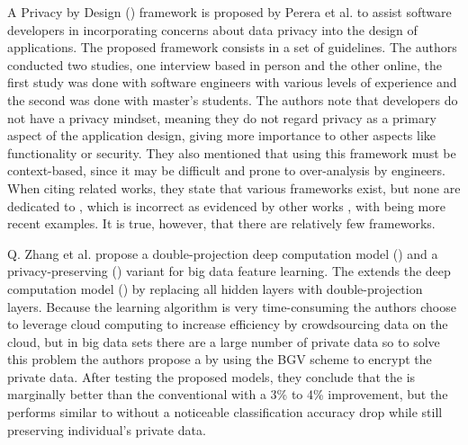 A Privacy by Design (\hyperlink{\acronym}{\acronym}) framework is proposed by Perera et al. \cite{perera2020designing}
to assist software developers in incorporating concerns about data privacy
into the design of \hyperlink{\acronym}{\acronym} applications. The proposed framework consists in
a set of guidelines. The authors conducted two studies, one interview based
in person and the other online, the first study was done with software engineers with
various levels of experience and the second was done with master's students.
The authors note that developers do not have a privacy mindset, meaning
they do not regard privacy as a primary aspect of the application design,
giving more importance to other aspects like functionality or security.
They also mentioned that using this framework must be context-based, since
it may be difficult and prone to over-analysis by engineers. When citing
related works, they state that various \hyperlink{\acronym}{\acronym} frameworks exist, but none are dedicated
to \hyperlink{\acronym}{\acronym}, which is incorrect as evidenced by other works \cite{o2017privacy, cavoukian2016embedding},
with \cite{alkhariji2023semantics, aljeraisy2021privacy} being more recent
examples. It is true, however, that there are relatively few \hyperlink{\acronym}{\acronym} \hyperlink{\acronym}{\acronym} frameworks.

Q. Zhang et al. \cite{zhang2017privacy} propose a double-projection deep
computation model (\hyperlink{\acronym}{\acronym}) and a privacy-preserving (\hyperlink{\acronym}{\acronym}) variant for
big data feature learning. The \hyperlink{\acronym}{\acronym} extends the deep computation model
(\hyperlink{\acronym}{\acronym}) by replacing all hidden layers with double-projection layers.
Because the learning algorithm is very time-consuming the authors choose
to leverage cloud computing to increase efficiency by crowdsourcing data
on the cloud, but in big data sets there are a large number of private data
so to solve this problem the authors propose a \hyperlink{\acronym}{\acronym} by using the BGV
scheme to encrypt the private data. After testing the proposed models,
they conclude that the \hyperlink{\acronym}{\acronym} is marginally better than the conventional \hyperlink{\acronym}{\acronym}
with a 3\% to 4\% improvement, but the \hyperlink{\acronym}{\acronym} performs similar to \hyperlink{\acronym}{\acronym}
without a noticeable classification accuracy drop while still preserving
individual's private data.

